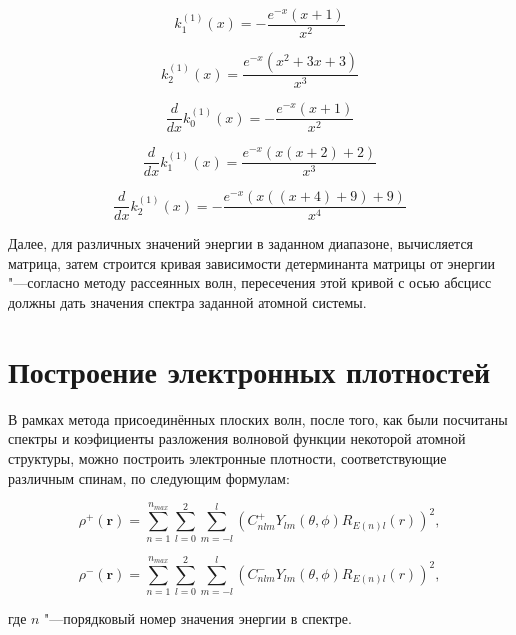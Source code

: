 \begin{equation}
  k_1^{(1)}(x) = -\frac{e^{-x} (x + 1)}{x^2}
\end{equation}

\begin{equation}
  k_2^{(1)}(x) = \frac{e^{-x} (x^2 + 3x + 3)}{x^3}
\end{equation}

\begin{equation}
  \frac{d}{dx} k_0^{(1)}(x)= -\frac{e^{-x} (x + 1)}{x^2}
\end{equation}

\begin{equation}
  \frac{d}{dx}k_1^{(1)}(x) = \frac{e^{-x} (x (x + 2) + 2)}{x^3}
\end{equation}

\begin{equation}
  \frac{d}{dx}k_2^{(1)}(x) = -\frac{e^{-x} (x ((x + 4) + 9) + 9)}{x^4}
\end{equation}

Далее, для различных значений энергии в заданном диапазоне, вычисляется матрица, затем строится кривая зависимости
детерминанта матрицы от энергии "---согласно методу рассеянных волн, пересечения этой кривой с осью абсцисс должны дать
значения спектра заданной атомной системы.

\section{\textbf{Построение электронных плотностей}}\label{sec:programming/orbitals}
В рамках метода присоединённых плоских волн, после того, как были посчитаны спектры и коэфициенты разложения волновой
функции некоторой атомной структуры, можно построить электронные плотности, соответствующие различным спинам, по
следующим формулам:

\begin{equation}
  \rho^{+}(\mathbf{r}) = \sum_{n=1}^{n_{max}}{
    \sum_{l=0}^{2} {
      \sum_{m=-l}^{l} {
        (C_{nlm}^{+} Y_{lm}(\theta, \phi) R_{E(n) l}(r))^2,
      }
    }
  }
\end{equation}

\begin{equation}
  \rho^{-}(\mathbf{r}) = \sum_{n=1}^{n_{max}}{
    \sum_{l=0}^{2} {
      \sum_{m=-l}^{l} {
        (C_{nlm}^{-} Y_{lm}(\theta, \phi) R_{E(n) l}(r))^2,
      }
    }
  }
\end{equation}

где $n$ "---порядковый номер значения энергии в спектре.


